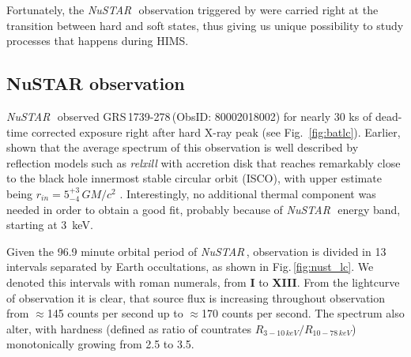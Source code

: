 \documentclass[a4paper,fleqn,usenatbib]{mnras}
\def\grs{{GRS\,1739-278\,}}
\def\nustar{{\em NuSTAR\,}}
\begin{document}
Fortunately, the \nustar\, observation triggered by \cite{miller15_nust} were carried right at the transition between hard and soft states, thus giving us unique possibility to study processes that happens during HIMS. 

\subsection{NuSTAR observation}
\label{sec:nust} 

\nustar\, observed \grs (ObsID: 80002018002) for nearly 30 ks of dead-time corrected exposure right after hard X-ray peak (see Fig.~\ref{fig:batlc}). Earlier, \cite{miller15_nust} shown that the average spectrum of this observation is well described by reflection models such as {\it relxill} \citep{garcia14, dauser14,dauser16} with accretion disk that reaches remarkably close to the black hole innermost stable circular orbit (ISCO), with upper estimate being $r_{in} = 5^{+3}_{-4}\, G M/c^{2}$ \citep{miller15_nust}. Interestingly, no additional thermal component was needed in order to obtain a good fit, probably because of \nustar\, energy band, starting at 3~keV. 

Given the 96.9 minute orbital period of \nustar, observation is divided in 13 intervals separated by Earth occultations, as shown in Fig.\,\ref{fig:nust_lc}. We denoted this intervals with roman numerals, from {\bf I} to {\bf XIII}. From the lightcurve of observation it is clear, that source flux is increasing throughout observation from $\approx$145 counts per second up to $\approx$170 counts per second. 
The spectrum also alter, with hardness (defined as ratio of countrates  $R_{3-10\,keV}/R_{10-78\,keV}$) monotonically growing from 2.5 to 3.5. 
\end{document}
